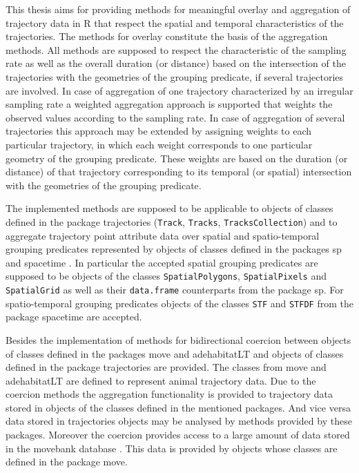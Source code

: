 \documentclass[12pt, oneside, a4paper]{scrbook}
\newcommand{\pkg}[1]{{\normalfont\fontseries{b}\selectfont #1}}
\let\proglang=\textsf
\let\code=\texttt
\begin{document}
This thesis aims for providing methods for meaningful overlay and aggregation of trajectory data in \proglang{R} that respect the spatial and temporal characteristics of the trajectories. The methods for overlay constitute the basis of the aggregation methods.
All methods are supposed to respect the characteristic of the sampling rate as well as the overall duration (or distance) based on the intersection of the trajectories with the geometries of the grouping predicate,
if several trajectories are involved.
In case of aggregation of one trajectory characterized by an irregular sampling rate a weighted aggregation approach is supported that weights the observed values according to the sampling rate.
In case of aggregation of several trajectories this approach may be extended by assigning weights to each particular trajectory, in which each weight corresponds to one particular geometry of the grouping predicate.
These weights are based on the duration (or distance) of 
that trajectory corresponding to its temporal (or spatial) intersection 
with the geometries of the grouping predicate.
\par\medskip

The implemented methods are supposed to be applicable to objects of classes defined in the package \pkg{trajectories} (\code{Track}, \code{Tracks}, \code{TracksCollection}) and to aggregate trajectory point attribute data over spatial and spatio-temporal grouping predicates represented by objects of classes defined in the packages \pkg{sp} \citep{pebesma_sp:_2014} and \pkg{spacetime} \citep{pebesma_spacetime:_2012}.
In particular the accepted spatial grouping predicates are supposed to be objects of the classes \code{SpatialPolygons}, \code{SpatialPixels} and \code{SpatialGrid} as well as their \code{data.frame} counterparts from the package \pkg{sp}.
For spatio-temporal grouping predicates objects of the classes \code{STF} and \code{STFDF} from the package \pkg{spacetime} are accepted.
\par\medskip

Besides the implementation of methods for bidirectional coercion between objects of classes defined in the packages \pkg{move} \citep{kranstauber_move:_2014} and \pkg{adehabitatLT} \citep{calenge_adehabitatlt:_2014} and objects of classes defined in the package \pkg{trajectories} are provided.
The classes from \pkg{move} and \pkg{adehabitatLT} are defined to represent animal trajectory data.
Due to the coercion methods the aggregation functionality is provided to trajectory data stored in objects of the classes defined in the mentioned packages. And vice versa data stored in \pkg{trajectories} objects may be analysed by methods provided by these packages.  Moreover the coercion provides access to a large amount of data stored in the movebank database \citep{wikelski_movebank:_2011}. This data is provided by objects whose classes are defined in the package \pkg{move}.
\end{document}
